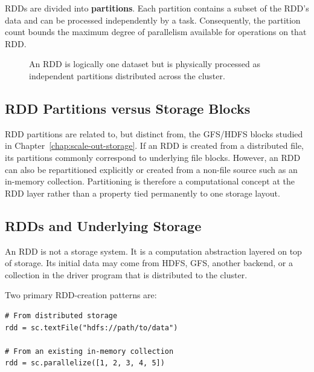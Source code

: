 \documentclass[11pt,a4paper,oneside]{book}
\begin{document}
RDDs are divided into \textbf{partitions}. Each partition contains a subset of the RDD's data and can be processed independently by a task. Consequently, the partition count bounds the maximum degree of parallelism available for operations on that RDD.

\begin{figure}[htbp]
\centering
{}
\caption{An RDD is logically one dataset but is physically processed as independent partitions distributed across the cluster.}
\label{fig:rdd-partitions}
\end{figure}

\subsection{RDD Partitions versus Storage Blocks}

RDD partitions are related to, but distinct from, the GFS/HDFS blocks studied in Chapter~\ref{chap:scale-out-storage}. If an RDD is created from a distributed file, its partitions commonly correspond to underlying file blocks. However, an RDD can also be repartitioned explicitly or created from a non-file source such as an in-memory collection. Partitioning is therefore a computational concept at the RDD layer rather than a property tied permanently to one storage layout.

\subsection{RDDs and Underlying Storage}

An RDD is not a storage system. It is a computation abstraction layered on top of storage. Its initial data may come from HDFS, GFS, another backend, or a collection in the driver program that is distributed to the cluster.

Two primary RDD-creation patterns are:

\begin{lstlisting}[style=sparkcode]
# From distributed storage
rdd = sc.textFile("hdfs://path/to/data")

# From an existing in-memory collection
rdd = sc.parallelize([1, 2, 3, 4, 5])
\end{lstlisting}
\end{document}
